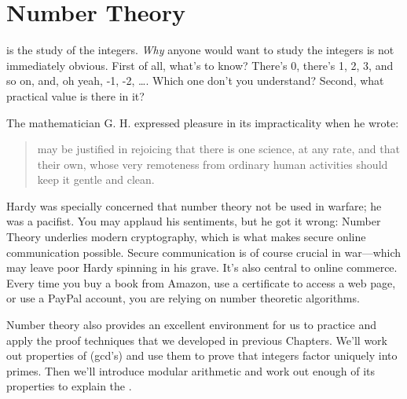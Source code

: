 \chapter{Number Theory}\label{number_theory_chap}
 is the study of the integers.  \emph{Why} anyone
would want to study the integers is not immediately obvious.  First of
all, what's to know?  There's 0, there's 1, 2, 3, and so on, and, oh yeah,
-1, -2, \dots.   Which one don't you understand?  Second, what practical
value is there in it?

\iffalse
Number theory is right at the core of mathematics; even Ug the Caveman
surely had some grasp of the integers---at least the positive ones.
In fact, the integers are so elementary that one might ask, ``What's
to study?''  There's 0, there's 1, 2, 3 and so on, and there's the
negatives.  Which one don't you understand?  Doesn't math become easy
when we don't have to worry about nasty numbers like $\sqrt{7}$, $1 /
\pi$, and $i$?  We can even forget about fractions!
\fi

The mathematician G. H.  expressed pleasure in its
impracticality when he wrote:
%
 \begin{quotation}
  may be justified in rejoicing that there
 is one science, at any rate, and that their own, whose very remoteness
 from ordinary human activities should keep it gentle and clean.
 \end{quotation}
%

 Hardy was specially concerned that number theory not be used in
 warfare; he was a pacifist.  You may applaud his sentiments, but he
 got it wrong: Number Theory underlies modern cryptography, which is
 what makes secure online communication possible.  Secure
 communication is of course crucial in war---which may leave poor
 Hardy spinning in his grave.  It's also central to online commerce.
 Every time you buy a book from Amazon, use a certificate to access a
 web page, or use a PayPal account, you are relying on number
 theoretic algorithms.

Number theory also provides an excellent environment for us to
practice and apply the proof techniques that we developed in previous
Chapters.  We'll work out properties of 
(gcd's) and use them to prove that integers factor uniquely into
primes.  Then we'll introduce modular arithmetic and work out enough
of its properties to explain the .


